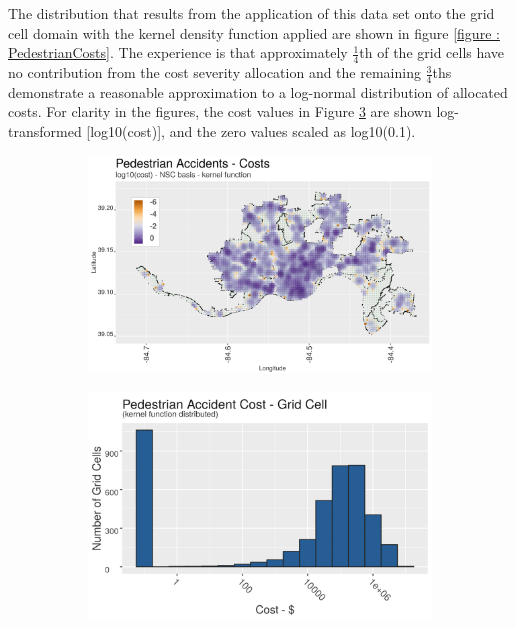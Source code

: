 \documentclass{llncs}
\begin{document}
The distribution that results from the application of this data set onto the grid cell domain with the kernel density function applied are shown in figure \ref{figure : PedestrianCosts}. The experience is that approximately $\frac{1}{4}$th of the grid cells have no contribution from the cost severity allocation and the remaining $\frac{3}{4}$ths demonstrate a reasonable approximation to a log-normal distribution of allocated costs. For clarity in the figures, the cost values in Figure  \ref{figure : pedestrianAccidentCostsHistogram} are shown log-transformed [log10(cost)], and the zero values scaled as log10(0.1).



\FloatBarrier
\begin{figure}
 	\caption{Pedestrian Accidents - Comprehensive Cost Severity (\$ Millions)}
    \label{figure : PedestrianCosts}
  \begin{subfigure}[b]{0.5\textwidth}
    \includegraphics[width = \textwidth, height = \textheight, keepaspectratio]{trafficAccidentsPedestrianCosts.png}
    \label{figure : trafficAccidentsPedestrianCosts}
  \end{subfigure}
  \begin{subfigure}[b]{0.5\textwidth}
    \includegraphics[width = \textwidth, height = \textheight, keepaspectratio]{pedestrianAccidentCostsHistogram.png}
    \label{figure : pedestrianAccidentCostsHistogram}
  \end{subfigure}
\end{figure}
\FloatBarrier
\end{document}
